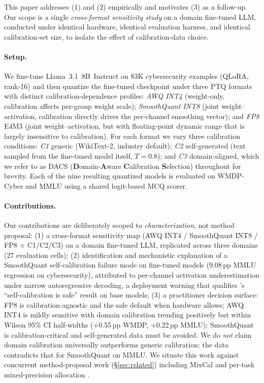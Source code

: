\documentclass[11pt]{article}
\newcommand{\dacs}{DACS}
\newcommand{\wmdp}{WMDP-Cyber}
\newcommand{\llama}{Llama~3.1~8B~Instruct}
\begin{document}
This paper addresses (1) and (2) empirically and motivates (3) as a
follow-up.  Our scope is a single \emph{cross-format sensitivity study} on
a domain fine-tuned LLM, conducted under identical hardware, identical
evaluation harness, and identical calibration-set size, to isolate the
effect of calibration-data choice.

\paragraph{Setup.}  We fine-tune \llama{} on 83K cybersecurity examples
(QLoRA, rank-16) and then quantize the fine-tuned checkpoint under three
PTQ formats with distinct calibration-dependence profiles:
\emph{AWQ INT4} (weight-only, calibration affects per-group weight scale);
\emph{SmoothQuant INT8} (joint weight--activation, calibration directly
drives the per-channel smoothing vector); and \emph{FP8} E4M3 (joint
weight--activation, but with floating-point dynamic range that is largely
insensitive to calibration).  For each format we vary three calibration
conditions: \emph{C1} generic (WikiText-2, industry default);
\emph{C2} self-generated (text sampled from the fine-tuned model itself,
$T=0.8$); and \emph{C3} domain-aligned, which we refer to as \dacs{}
(\textbf{D}omain-\textbf{A}ware \textbf{C}alibration \textbf{S}election)
throughout for brevity.  Each of the nine resulting quantized models is
evaluated on \wmdp{} and MMLU using a shared logit-based MCQ scorer.

\paragraph{Contributions.}
\begin{sloppypar}
Our contributions are deliberately scoped to
\emph{characterization}, not method proposal:
(1) a cross-format sensitivity map (AWQ INT4 / SmoothQuant INT8 / FP8
$\times$ C1/C2/C3) on a domain fine-tuned LLM, replicated across three
domains (27 evaluation cells);
(2) identification and mechanistic explanation of a SmoothQuant
self-calibration failure mode on fine-tuned models (9.08\,pp MMLU
regression on cybersecurity), attributed to per-channel activation
underestimation under narrow autoregressive decoding, a deployment
warning that qualifies \citet{williams2025selfcalib}'s
``self-calibration is safe'' result on base models;
(3) a practitioner decision surface: FP8 is calibration-agnostic and
the safe default when hardware allows; AWQ INT4 is mildly sensitive
with domain calibration trending positively but within Wilson 95\%
CI half-widths ($+$0.55\,pp WMDP, $+$0.22\,pp MMLU); SmoothQuant is
calibration-critical and self-generated data must be avoided.
We do \emph{not} claim domain calibration universally outperforms
generic calibration: the data contradicts that for SmoothQuant on
MMLU.  We situate this work against concurrent method-proposal work
(\S\ref{sec:related}) including MixCal \citep{mixcal2026} and
per-task mixed-precision allocation \citep{levi2026pertask}.
\end{sloppypar}
\end{document}
